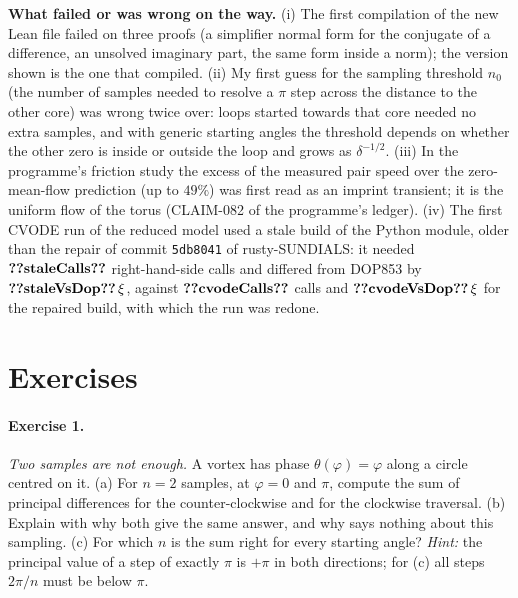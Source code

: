 \begin{honestbox}
\textbf{What failed or was wrong on the way.} (i) The first compilation of the new Lean file failed on three proofs (a simplifier normal form for the conjugate of a difference, an unsolved imaginary part, the same form inside a norm); the version shown is the one that compiled. (ii) My first guess for the sampling threshold $n_0$ (the number of samples needed to resolve a $\pi$ step across the distance to the other core) was wrong twice over: loops started towards that core needed no extra samples, and with generic starting angles the threshold depends on whether the other zero is inside or outside the loop and grows as $\delta^{-1/2}$. (iii) In the programme's friction study the excess of the measured pair speed over the zero-mean-flow prediction (up to $49\%$) was first read as an imprint transient; it is the uniform flow of the torus (CLAIM-082 of the programme's ledger). (iv) The first CVODE run of the reduced model used a stale build of the Python module, older than the repair of commit \texttt{5db8041} of rusty-SUNDIALS: it needed $\cthreeNum{staleCalls}$ right-hand-side calls and differed from DOP853 by $\cthreeNum{staleVsDop}\,\xi$, against $\cthreeNum{cvodeCalls}$ calls and $\cthreeNum{cvodeVsDop}\,\xi$ for the repaired build, with which the run was redone.
\end{honestbox}

\section*{Exercises}\label{ch03:ex}

\paragraph{Exercise 1.} \emph{Two samples are not enough.} A vortex has phase $\theta(\varphi)=\varphi$ along a circle centred on it. (a) For $n=2$ samples, at $\varphi=0$ and $\pi$, compute the sum of principal differences for the counter-clockwise and for the clockwise traversal. (b) Explain with  why both give the same answer, and why  says nothing about this sampling. (c) For which $n$ is the sum right for every starting angle? \emph{Hint:} the principal value of a step of exactly $\pi$ is $+\pi$ in both directions; for (c) all steps $2\pi/n$ must be below $\pi$.

